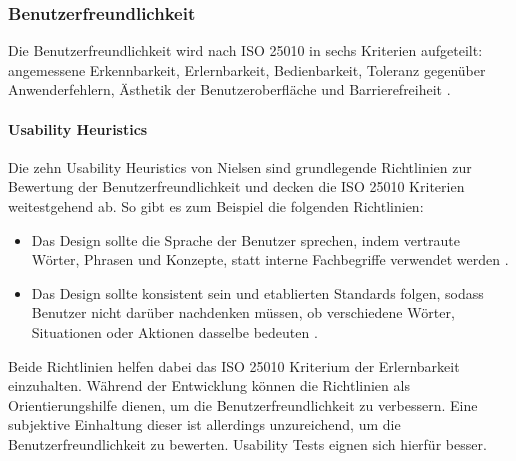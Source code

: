 \subsubsection{Benutzerfreundlichkeit}
Die Benutzerfreundlichkeit wird nach ISO 25010 in sechs Kriterien aufgeteilt: angemessene Erkennbarkeit, Erlernbarkeit, Bedienbarkeit, Toleranz gegenüber Anwenderfehlern, Ästhetik der Benutzeroberfläche und Barrierefreiheit \cite{ISO25010}.

\paragraph{Usability Heuristics}
Die zehn Usability Heuristics von Nielsen sind grundlegende Richtlinien zur Bewertung der Benutzerfreundlichkeit \cite{Nielsen.1994} und decken die ISO 25010 Kriterien weitestgehend ab. So gibt es zum Beispiel die folgenden Richtlinien:

\begin{itemize}
    \item Das Design sollte die Sprache der Benutzer sprechen, indem vertraute Wörter, Phrasen und Konzepte, statt interne Fachbegriffe verwendet werden \cite[Regel 2]{Nielsen.1994}.
    \item Das Design sollte konsistent sein und etablierten Standards folgen, sodass Benutzer nicht darüber nachdenken müssen, ob verschiedene Wörter, Situationen oder Aktionen dasselbe bedeuten \cite[Regel 4]{Nielsen.1994}.
\end{itemize}

Beide Richtlinien helfen dabei das ISO 25010 Kriterium der Erlernbarkeit einzuhalten. Während der Entwicklung können die Richtlinien als Orientierungshilfe dienen, um die Benutzerfreundlichkeit zu verbessern. Eine subjektive Einhaltung dieser ist allerdings unzureichend, um die Benutzerfreundlichkeit zu bewerten. Usability Tests eignen sich hierfür besser.

